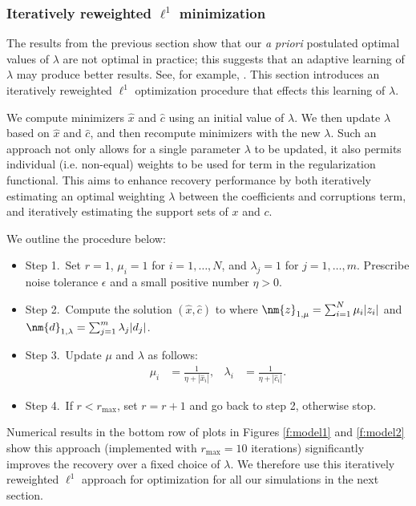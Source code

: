 \subsubsection{Iteratively reweighted $\ell^1$ minimization}\label{sec:iteratively-reweighted}
The results from the previous section show that our \textit{a priori} postulated optimal values of $\lambda$ are not optimal in practice; this suggests that an adaptive learning of $\lambda$ may produce better results. See, for example, \cite{CandesWakinBoydReweighted}. This section introduces an iteratively reweighted $\ell^1$ optimization procedure that effects this learning of $\lambda$.

We compute minimizers $\hat{x}$ and $\hat{c}$ using an initial value of $\lambda$. We then update $\lambda$ based on $\hat{x}$ and $\hat{c}$, and then recompute minimizers with the new $\lambda$. Such an approach not only allows for a single parameter $\lambda$ to be updated, it also permits individual (i.e. non-equal) weights to be used for term in the regularization functional.  This aims to enhance recovery performance by both iteratively estimating an optimal weighting $\lambda$ between the coefficients and corruptions term, and iteratively estimating the support sets of $x$ and $c$.

We outline the procedure below:
\begin{itemize}
\item Step 1.\ Set $r=1$, $\mu_i=1$ for $i=1, \ldots, N$, and $\lambda_j = 1$ for $j=1,\ldots,m$. Prescribe noise tolerance $\epsilon$ and a small positive number $\eta > 0$.
\item Step 2.\ Compute the solution $(\widehat{x}, \widehat{c})$ to
where $\nm{z}_{1,\mu} = \sum^{N}_{i=1} \mu_i | z_i|$ and $\nm{d}_{1,\lambda} = \sum^{m}_{j=1} \lambda_j |d_j|$.
\item Step 3.\ Update $\mu$ and $\lambda$ as follows:
  \begin{align}\label{eq:weights}
    \mu_{i} &= \frac{1}{\eta + |\hat{x}_i|},& \lambda_i &= \frac{1}{\eta + |\hat{c}_i|}.
  \end{align}
\item Step 4.\ If $r< r_{\max}$, set $r = r+1$ and go back to step 2, otherwise stop.
\end{itemize}
Numerical results in the bottom row of plots in Figures \ref{f:model1} and \ref{f:model2} show this approach (implemented with $r_{\max} = 10$ iterations) significantly improves the recovery over a fixed choice of $\lambda$. We therefore use this iteratively reweighted $\ell^1$ approach for optimization for all our simulations in the next section.

